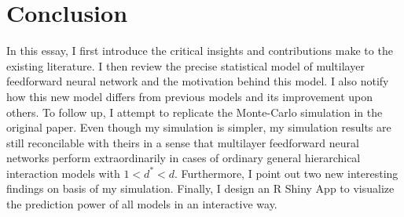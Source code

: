 \section{Conclusion}
\label{sec:conclusion}

In this essay, I first introduce the critical insights and contributions \cite{Bauer2019} make to the existing literature. I then review the precise statistical model of multilayer feedforward neural network and the motivation behind this model. I also notify how this new model differs from previous models and its improvement upon others. To follow up, I attempt to replicate the Monte-Carlo simulation in the original paper. Even though my simulation is simpler, my simulation results are still reconcilable with theirs in a sense that multilayer feedforward neural networks perform extraordinarily in cases of ordinary general hierarchical interaction models with $1<d^*<d$. Furthermore, I point out two new interesting findings on basis of my simulation. Finally, I design an R Shiny App to visualize the prediction power of all models in an interactive way. 